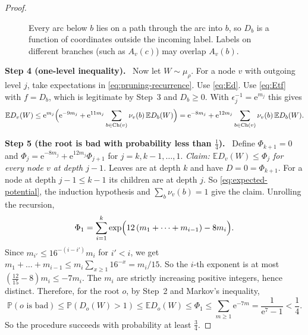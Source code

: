 \documentclass[11pt]{article}
\numberwithin{equation}{section}
\newcommand{\PP}{\mathbb P}
\newcommand{\EE}{\mathbb E}
\newcommand{\ch}{\operatorname{Ch}}
\newcommand{\ee}{\mathrm e}
\newcommand{\step}[2]{\medskip\noindent\textbf{Step #1 (#2).}\ }
\begin{document}
\begin{proof}
\begin{figure}[!ht]
\centering
{}
\caption{Every arc below $b$ lies on a path through the arc into $b$,
so $D_b$ is a function of coordinates outside the incoming label.
Labels on different branches (such as $A_v(c)$) may overlap $A_v(b)$.}
\label{fig:outside}
\end{figure}

\step{4}{one-level inequality}
Now let $W\sim\mu_\rho$. For a node $v$ with outgoing level $j$, take
expectations in \eqref{eq:pruning-recurrence}. Use \eqref{eq:Ed}. Use
\eqref{eq:Etf} with $f=D_b$, which is legitimate by Step~3 and
$D_b\ge0$. With $\epsilon_j^{-1}=\ee^{m_j}$ this gives
\begin{equation}\label{eq:expected-potential}
 \EE D_v(W)
 \le \ee^{m_j}\Bigl(\ee^{-9m_j}
    +\ee^{11m_j}\sum_{b\in\ch(v)}\nu_v(b)\,\EE D_b(W)\Bigr)
 = \ee^{-8m_j}
    +\ee^{12m_j}\sum_{b\in\ch(v)}\nu_v(b)\,\EE D_b(W).
\end{equation}

\step{5}{the root is bad with probability less than $\frac14$}
Define $\Phi_{k+1}=0$ and
$\Phi_j=\ee^{-8m_j}+\ee^{12m_j}\Phi_{j+1}$ for $j=k,k-1,\dots,1$.
\emph{Claim: $\EE D_v(W)\le\Phi_j$ for every node $v$ at depth $j-1$.}
Leaves are at depth $k$ and have $D=0=\Phi_{k+1}$. For a node at depth
$j-1\le k-1$ its children are at depth $j$. So
\eqref{eq:expected-potential}, the induction hypothesis and
$\sum_b\nu_v(b)=1$ give the claim. Unrolling the recursion,
\begin{equation}\label{eq:Phi}
 \Phi_1=\sum_{i=1}^{k}
 \exp\Bigl(12\,(m_1+\dots+m_{i-1})-8m_i\Bigr).
\end{equation}
Since $m_{i'}\le16^{-(i-i')}m_i$ for $i'<i$, we get
$m_1+\dots+m_{i-1}\le m_i\sum_{x\ge1}16^{-x}=m_i/15$. So the $i$-th
exponent is at most $(\tfrac{12}{15}-8)m_i\le-7m_i$. The $m_i$ are
strictly increasing positive integers, hence distinct. Therefore, for
the root $o$, by Step~2 and Markov's inequality,
\[
 \PP(o\text{ is bad})\le\PP(D_o(W)>1)\le\EE D_o(W)\le\Phi_1
 \le\sum_{m\ge1}\ee^{-7m}=\frac1{\ee^{7}-1}<\frac14 .
\]
So the procedure succeeds with probability at least $\frac34$.


\end{proof}
\end{document}
